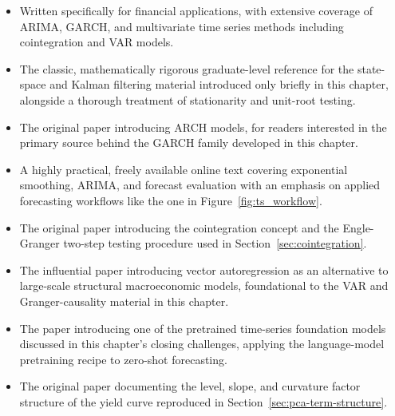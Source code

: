 \documentclass[../ai_in_finance]{subfiles}
\begin{document}
\begin{itemize}
    \item {} Written specifically for financial applications, with extensive coverage of ARIMA, GARCH, and multivariate time series methods including cointegration and VAR models.
    \item {} The classic, mathematically rigorous graduate-level reference for the state-space and Kalman filtering material introduced only briefly in this chapter, alongside a thorough treatment of stationarity and unit-root testing.
    \item {} The original paper introducing ARCH models, for readers interested in the primary source behind the GARCH family developed in this chapter.
    \item {} A highly practical, freely available online text covering exponential smoothing, ARIMA, and forecast evaluation with an emphasis on applied forecasting workflows like the one in Figure~\ref{fig:ts_workflow}.
    \item {} The original paper introducing the cointegration concept and the Engle-Granger two-step testing procedure used in Section~\ref{sec:cointegration}.
    \item {} The influential paper introducing vector autoregression as an alternative to large-scale structural macroeconomic models, foundational to the VAR and Granger-causality material in this chapter.
    \item {} The paper introducing one of the pretrained time-series foundation models discussed in this chapter's closing challenges, applying the language-model pretraining recipe to zero-shot forecasting.
    \item {} The original paper documenting the level, slope, and curvature factor structure of the yield curve reproduced in Section~\ref{sec:pca-term-structure}.
\end{itemize}
\end{document}
